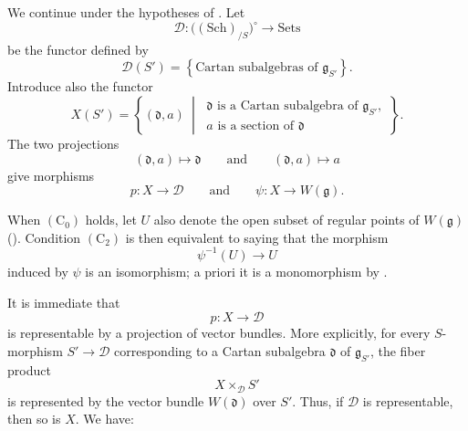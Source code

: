 
We continue under the hypotheses of . Let
\[
  \mathcal D\colon
  \bigl((\mathrm{Sch})_{/S}\bigr)^\circ
  \longrightarrow \mathrm{Sets}
\]
be the functor defined by
\[
  \mathcal D(S')
  =\left\{
    \text{Cartan subalgebras of }\mathfrak g_{S'}
   \right\}.
\]
Introduce also the functor
\[
  X(S')
  =\left\{
    (\mathfrak d,a)\ \middle|\
    \begin{array}{l}
      \mathfrak d\text{ is a Cartan subalgebra of }\mathfrak g_{S'},\\
      a\text{ is a section of }\mathfrak d
    \end{array}
   \right\}.
\]
The two projections
\[
  (\mathfrak d,a)\longmapsto\mathfrak d
  \qquad\text{and}\qquad
  (\mathfrak d,a)\longmapsto a
\]
give morphisms
\[
  p\colon X\longrightarrow\mathcal D
  \qquad\text{and}\qquad
  \psi\colon X\longrightarrow W(\mathfrak g).
\]

When \((\mathrm C_0)\) holds, let \(U\) also denote the open subset
of regular points of \(W(\mathfrak g)\) \textup{()}. Condition
\((\mathrm C_2)\) is then equivalent to saying that the morphism
\[
  \psi^{-1}(U)\longrightarrow U
\]
induced by \(\psi\) is an isomorphism; a priori it is a
monomorphism by .

It is immediate that
\[
  p\colon X\longrightarrow\mathcal D
\]
is representable by a projection of vector bundles. More
explicitly, for every \(S\)-morphism \(S'\to\mathcal D\)
corresponding to a Cartan subalgebra \(\mathfrak d\) of
\(\mathfrak g_{S'}\), the fiber product
\[
  X\times_{\mathcal D}S'
\]
is represented by the vector bundle \(W(\mathfrak d)\) over
\(S'\). Thus, if \(\mathcal D\) is representable, then so is \(X\).
We have:

